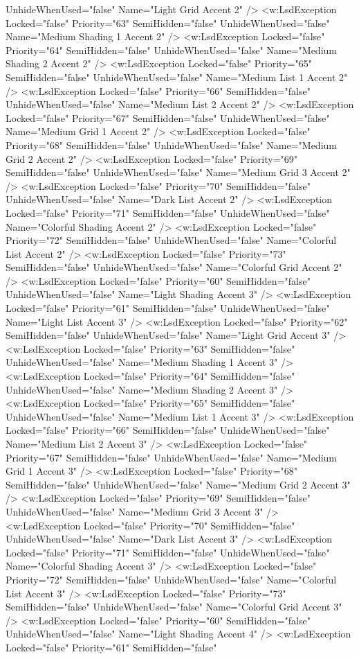 UnhideWhenUsed="false" Name="Light Grid Accent 2" /> <w:LsdException Locked="false" Priority="63" SemiHidden="false"    UnhideWhenUsed="false" Name="Medium Shading 1 Accent 2" /> <w:LsdException Locked="false" Priority="64" SemiHidden="false"    UnhideWhenUsed="false" Name="Medium Shading 2 Accent 2" /> <w:LsdException Locked="false" Priority="65" SemiHidden="false"    UnhideWhenUsed="false" Name="Medium List 1 Accent 2" /> <w:LsdException Locked="false" Priority="66" SemiHidden="false"    UnhideWhenUsed="false" Name="Medium List 2 Accent 2" /> <w:LsdException Locked="false" Priority="67" SemiHidden="false"    UnhideWhenUsed="false" Name="Medium Grid 1 Accent 2" /> <w:LsdException Locked="false" Priority="68" SemiHidden="false"    UnhideWhenUsed="false" Name="Medium Grid 2 Accent 2" /> <w:LsdException Locked="false" Priority="69" SemiHidden="false"    UnhideWhenUsed="false" Name="Medium Grid 3 Accent 2" /> <w:LsdException Locked="false" Priority="70" SemiHidden="false"    UnhideWhenUsed="false" Name="Dark List Accent 2" /> <w:LsdException Locked="false" Priority="71" SemiHidden="false"    UnhideWhenUsed="false" Name="Colorful Shading Accent 2" /> <w:LsdException Locked="false" Priority="72" SemiHidden="false"    UnhideWhenUsed="false" Name="Colorful List Accent 2" /> <w:LsdException Locked="false" Priority="73" SemiHidden="false"    UnhideWhenUsed="false" Name="Colorful Grid Accent 2" /> <w:LsdException Locked="false" Priority="60" SemiHidden="false"    UnhideWhenUsed="false" Name="Light Shading Accent 3" /> <w:LsdException Locked="false" Priority="61" SemiHidden="false"    UnhideWhenUsed="false" Name="Light List Accent 3" /> <w:LsdException Locked="false" Priority="62" SemiHidden="false"    UnhideWhenUsed="false" Name="Light Grid Accent 3" /> <w:LsdException Locked="false" Priority="63" SemiHidden="false"    UnhideWhenUsed="false" Name="Medium Shading 1 Accent 3" /> <w:LsdException Locked="false" Priority="64" SemiHidden="false"    UnhideWhenUsed="false" Name="Medium Shading 2 Accent 3" /> <w:LsdException Locked="false" Priority="65" SemiHidden="false"    UnhideWhenUsed="false" Name="Medium List 1 Accent 3" /> <w:LsdException Locked="false" Priority="66" SemiHidden="false"    UnhideWhenUsed="false" Name="Medium List 2 Accent 3" /> <w:LsdException Locked="false" Priority="67" SemiHidden="false"    UnhideWhenUsed="false" Name="Medium Grid 1 Accent 3" /> <w:LsdException Locked="false" Priority="68" SemiHidden="false"    UnhideWhenUsed="false" Name="Medium Grid 2 Accent 3" /> <w:LsdException Locked="false" Priority="69" SemiHidden="false"    UnhideWhenUsed="false" Name="Medium Grid 3 Accent 3" /> <w:LsdException Locked="false" Priority="70" SemiHidden="false"    UnhideWhenUsed="false" Name="Dark List Accent 3" /> <w:LsdException Locked="false" Priority="71" SemiHidden="false"    UnhideWhenUsed="false" Name="Colorful Shading Accent 3" /> <w:LsdException Locked="false" Priority="72" SemiHidden="false"    UnhideWhenUsed="false" Name="Colorful List Accent 3" /> <w:LsdException Locked="false" Priority="73" SemiHidden="false"    UnhideWhenUsed="false" Name="Colorful Grid Accent 3" /> <w:LsdException Locked="false" Priority="60" SemiHidden="false"    UnhideWhenUsed="false" Name="Light Shading Accent 4" /> <w:LsdException Locked="false" Priority="61" SemiHidden="false"    